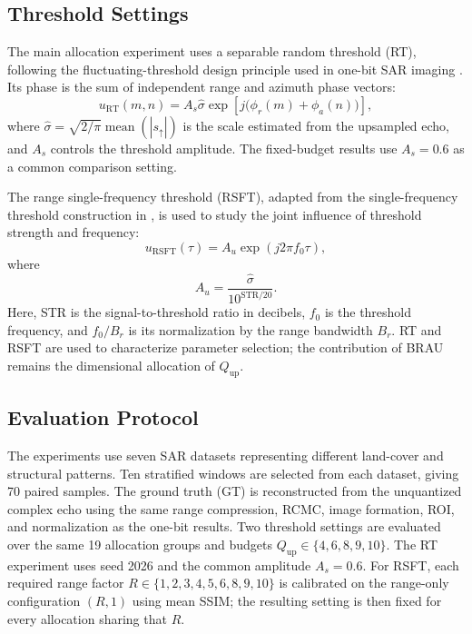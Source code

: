 \documentclass[conference]{IEEEtran}
\begin{document}
\subsection{Threshold Settings}

The main allocation experiment uses a separable random threshold (RT), following the fluctuating-threshold design principle used in one-bit SAR imaging \cite{nie2025fixed}. Its phase is the sum of independent range and azimuth phase vectors:
\begin{equation}
    u_{\mathrm{RT}}(m,n)
    =A_s\hat{\sigma}\exp\!\left[j\bigl(\phi_r(m)+\phi_a(n)\bigr)\right],
\end{equation}
where $\hat{\sigma}=\sqrt{2/\pi}\operatorname{mean}(|s_{\uparrow}|)$ is the scale estimated from the upsampled echo, and $A_s$ controls the threshold amplitude. The fixed-budget results use $A_s=0.6$ as a common comparison setting.

The range single-frequency threshold (RSFT), adapted from the single-frequency threshold construction in \cite{zhao2019onebit}, is used to study the joint influence of threshold strength and frequency:
\begin{equation}
    u_{\mathrm{RSFT}}(\tau)
    =A_u\exp(j2\pi f_0\tau),
\end{equation}
where
\begin{equation}
    A_u=\frac{\hat{\sigma}}{10^{\mathrm{STR}/20}}.
\end{equation}
Here, STR is the signal-to-threshold ratio in decibels, $f_0$ is the threshold frequency, and $f_0/B_r$ is its normalization by the range bandwidth $B_r$. RT and RSFT are used to characterize parameter selection; the contribution of BRAU remains the dimensional allocation of $Q_{\mathrm{up}}$.

\subsection{Evaluation Protocol}

The experiments use seven SAR datasets representing different land-cover and structural patterns. Ten stratified windows are selected from each dataset, giving 70 paired samples. The ground truth (GT) is reconstructed from the unquantized complex echo using the same range compression, RCMC, image formation, ROI, and normalization as the one-bit results. Two threshold settings are evaluated over the same 19 allocation groups and budgets $Q_{\mathrm{up}}\in\{4,6,8,9,10\}$. The RT experiment uses seed 2026 and the common amplitude $A_s=0.6$. For RSFT, each required range factor $R\in\{1,2,3,4,5,6,8,9,10\}$ is calibrated on the range-only configuration $(R,1)$ using mean SSIM; the resulting setting is then fixed for every allocation sharing that $R$.
\end{document}
